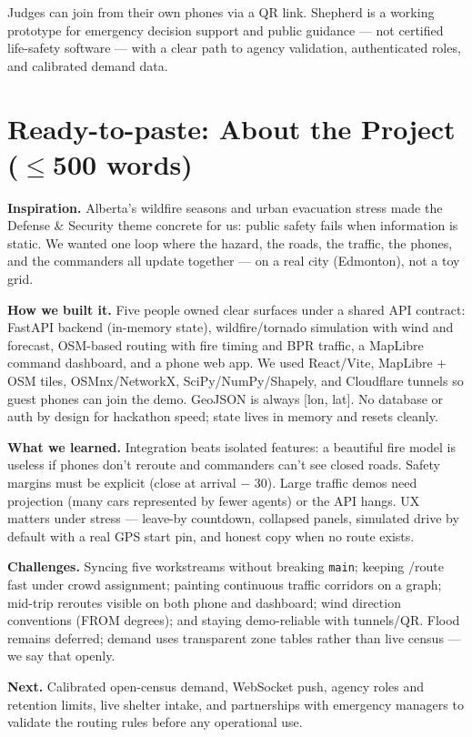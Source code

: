 \documentclass[10pt]{extarticle}
\begin{document}
Judges can join from their own phones via a QR link. Shepherd is a working prototype for emergency decision support and public guidance --- not certified life-safety software --- with a clear path to agency validation, authenticated roles, and calibrated demand data.

\section{Ready-to-paste: About the Project ($\le$500 words)}
\textbf{Inspiration.} Alberta's wildfire seasons and urban evacuation stress made the Defense \& Security theme concrete for us: public safety fails when information is static. We wanted one loop where the hazard, the roads, the traffic, the phones, and the commanders all update together --- on a real city (Edmonton), not a toy grid.

\textbf{How we built it.} Five people owned clear surfaces under a shared API contract: FastAPI backend (in-memory state), wildfire/tornado simulation with wind and forecast, OSM-based routing with fire timing and BPR traffic, a MapLibre command dashboard, and a phone web app. We used React/Vite, MapLibre + OSM tiles, OSMnx/NetworkX, SciPy/NumPy/Shapely, and Cloudflare tunnels so guest phones can join the demo. GeoJSON is always [lon, lat]. No database or auth by design for hackathon speed; state lives in memory and resets cleanly.

\textbf{What we learned.} Integration beats isolated features: a beautiful fire model is useless if phones don't reroute and commanders can't see closed roads. Safety margins must be explicit (close at arrival $-$ 30). Large traffic demos need projection (many cars represented by fewer agents) or the API hangs. UX matters under stress --- leave-by countdown, collapsed panels, simulated drive by default with a real GPS start pin, and honest copy when no route exists.

\textbf{Challenges.} Syncing five workstreams without breaking \texttt{main}; keeping /route fast under crowd assignment; painting continuous traffic corridors on a graph; mid-trip reroutes visible on both phone and dashboard; wind direction conventions (FROM degrees); and staying demo-reliable with tunnels/QR. Flood remains deferred; demand uses transparent zone tables rather than live census --- we say that openly.

\textbf{Next.} Calibrated open-census demand, WebSocket push, agency roles and retention limits, live shelter intake, and partnerships with emergency managers to validate the routing rules before any operational use.
\end{document}
